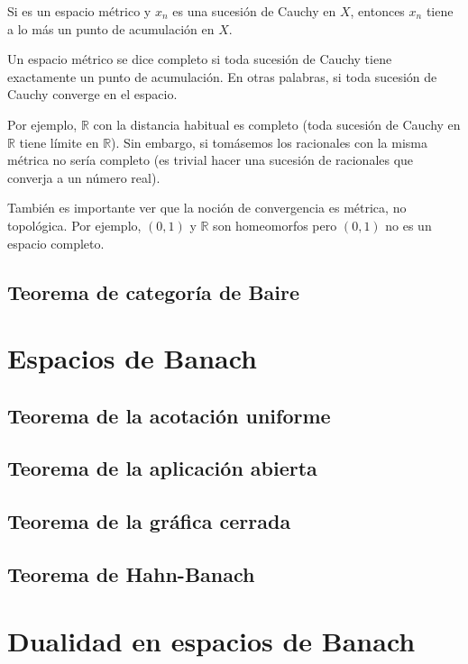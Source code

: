\documentclass[palatino,nochap]{apuntes}
\begin{document}
\begin{prop} Si \sdst es un espacio métrico y $x_n$ es una sucesión de Cauchy en $X$, entonces $x_n$ tiene a lo más un punto de acumulación en $X$.
\end{prop}

\begin{defn} Un espacio métrico \sdst se dice completo si toda sucesión de Cauchy tiene exactamente un punto de acumulación. En otras palabras, si toda sucesión de Cauchy converge en el espacio.
\end{defn}

Por ejemplo, $ℝ$ con la distancia habitual es completo (toda sucesión de Cauchy en $ℝ$ tiene límite en $ℝ$). Sin embargo, si tomásemos los racionales con la misma métrica no sería completo (es trivial hacer una sucesión de racionales que converja a un número real).

También es importante ver que la noción de convergencia es métrica, no topológica. Por ejemplo, $(0,1)$ y $ℝ$ son homeomorfos pero $(0,1)$ no es un espacio completo.

\subsection{Teorema de categoría de Baire}

\section{Espacios de Banach}

\subsection{Teorema de la acotación uniforme}

\subsection{Teorema de la aplicación abierta}

\subsection{Teorema de la gráfica cerrada}

\subsection{Teorema de Hahn-Banach}

\section{Dualidad en espacios de Banach}
\end{document}
